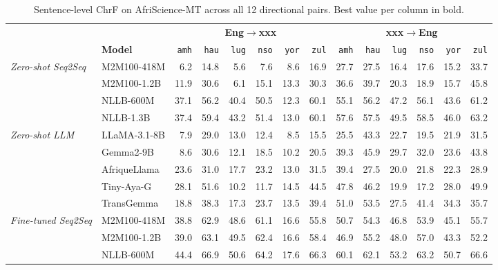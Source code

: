 \begin{table}[t!]
\centering
\footnotesize
\setlength{\tabcolsep}{4pt}
\renewcommand{\arraystretch}{1.05}
\caption{Sentence-level ChrF on AfriScience-MT across all 12 directional pairs. Best value per column in bold.}
\label{tab:headline_chrf}
\begin{tabular}{llrrrrrrrrrrrr}
\toprule
 & & \multicolumn{6}{c}{\textbf{Eng$\to$xxx}} & \multicolumn{6}{c}{\textbf{xxx$\to$Eng}} \\
\cmidrule(lr){3-8}\cmidrule(lr){9-14}
 & \textbf{Model} & \texttt{amh} & \texttt{hau} & \texttt{lug} & \texttt{nso} & \texttt{yor} & \texttt{zul} & \texttt{amh} & \texttt{hau} & \texttt{lug} & \texttt{nso} & \texttt{yor} & \texttt{zul} \\
\midrule
\multirow{4}{*}{\textit{Zero-shot Seq2Seq}} & M2M100-418M & 6.2 & 14.8 & 5.6 & 7.6 & 8.6 & 16.9 & 27.7 & 27.5 & 16.4 & 17.6 & 15.2 & 33.7 \\
 & M2M100-1.2B & 11.9 & 30.6 & 6.1 & 15.1 & 13.3 & 30.3 & 36.6 & 39.7 & 20.3 & 18.9 & 15.7 & 45.8 \\
 & NLLB-600M & 37.1 & 56.2 & 40.4 & 50.5 & 12.3 & 60.1 & 55.1 & 56.2 & 47.2 & 56.1 & 43.6 & 61.2 \\
 & NLLB-1.3B & 37.4 & 59.4 & 43.2 & 51.4 & 13.0 & 60.1 & 57.6 & 57.5 & 49.5 & 58.5 & 46.0 & 63.2 \\
\midrule
\multirow{5}{*}{\textit{Zero-shot LLM}} & LLaMA-3.1-8B & 7.9 & 29.0 & 13.0 & 12.4 & 8.5 & 15.5 & 25.5 & 43.3 & 22.7 & 19.5 & 21.9 & 31.5 \\
 & Gemma2-9B & 8.6 & 30.6 & 12.1 & 18.5 & 10.2 & 20.5 & 39.3 & 45.9 & 29.7 & 32.0 & 23.6 & 43.8 \\
 & AfriqueLlama & 23.6 & 31.0 & 17.7 & 23.2 & 13.0 & 31.5 & 39.4 & 27.5 & 20.0 & 21.8 & 22.3 & 28.9 \\
 & Tiny-Aya-G & 28.1 & 51.6 & 10.2 & 11.7 & 14.5 & 44.5 & 47.8 & 46.2 & 19.9 & 17.2 & 28.0 & 49.9 \\
 & TransGemma & 18.8 & 38.3 & 17.3 & 23.7 & 13.5 & 39.4 & 51.0 & 53.5 & 27.5 & 41.4 & 34.3 & 35.7 \\
\midrule
\multirow{4}{*}{\textit{Fine-tuned Seq2Seq}} & M2M100-418M & 38.8 & 62.9 & 48.6 & 61.1 & 16.6 & 55.8 & 50.7 & 54.3 & 46.8 & 53.9 & 45.1 & 55.7 \\
 & M2M100-1.2B & 39.0 & 63.1 & 49.5 & 62.4 & 16.6 & 58.4 & 46.9 & 55.2 & 48.0 & 57.0 & 43.3 & 52.2 \\
 & NLLB-600M & 44.4 & 66.9 & 50.6 & 64.2 & 17.6 & 66.3 & 60.1 & 62.1 & 53.2 & 63.2 & 50.7 & 66.6 \\

\end{tabular}
\end{table}
